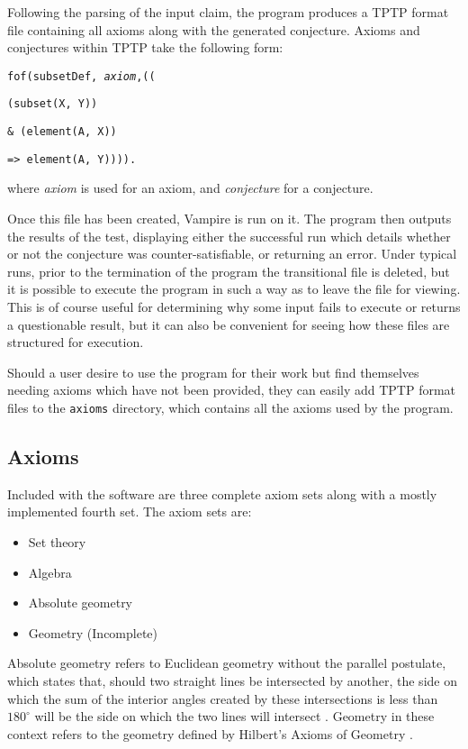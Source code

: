 Following the parsing of the input claim, the program produces a TPTP format file containing all axioms along with the generated conjecture. Axioms and conjectures within TPTP take the following form:

\texttt{fof(subsetDef, \textit{axiom},((}

\texttt{(subset(X, Y))}

\texttt{\& (element(A, X))}

\texttt{=> element(A, Y)))).}

\noindent
where \textit{axiom} is used for an axiom, and \textit{conjecture} for a conjecture.

Once this file has been created, Vampire is run on it. The program then outputs the results of the test, displaying either the successful run which details whether or not the conjecture was counter-satisfiable, or returning an error. Under typical runs, prior to the termination of the program the transitional file is deleted, but it is possible to execute the program in such a way as to leave the file for viewing. This is of course useful for determining why some input fails to execute or returns a questionable result, but it can also be convenient for seeing how these files are structured for execution.

Should a user desire to use the program for their work but find themselves needing axioms which have not been provided, they can easily add TPTP format files to the \texttt{axioms} directory, which contains all the axioms used by the program.

\subsection{Axioms}

Included with the software are three complete axiom sets along with a mostly implemented fourth set. The axiom sets are:
\begin{itemize}
	\item Set theory
	\item Algebra
	\item Absolute geometry
	\item Geometry (Incomplete)
\end{itemize}

Absolute geometry refers to Euclidean geometry without the parallel postulate, which states that, should two straight lines be intersected by another, the side on which the sum of the interior angles created by these intersections is less than $180^{\circ}$ will be the side on which the two lines will intersect \cite{absolute}. Geometry in these context refers to the geometry defined by Hilbert's Axioms of Geometry \cite{Hilbert}.

